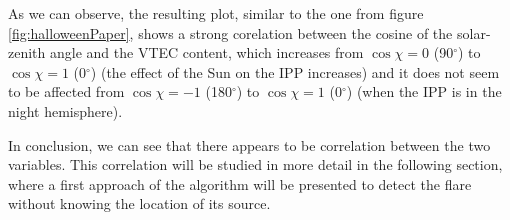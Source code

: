 As we can observe, the resulting plot, similar to the one from figure \ref{fig:halloweenPaper}, shows a strong corelation between the cosine of the solar-zenith angle and the VTEC content, which increases from $\cos\chi = 0$ (90$^{\circ}$) to $\cos\chi = 1$ (0$^{\circ}$) (the effect of the Sun on the IPP increases) and it does not seem to be affected from $\cos\chi = -1$ (180$^{\circ}$) to $\cos\chi = 1$ (0$^{\circ}$) (when the IPP is in the night hemisphere).

In conclusion, we can see that there appears to be correlation between the two variables. This correlation will be studied in more detail in the following section, where a first approach of the algorithm will be presented to detect the flare without knowing the location of its source.













